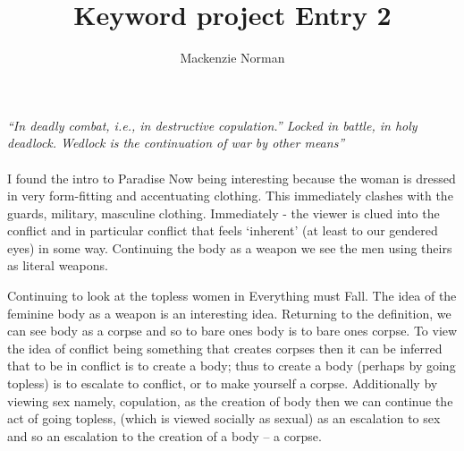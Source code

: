 \documentclass{article}
\title{Keyword project Entry 2}
\author{Mackenzie Norman}
\begin{document}
\textit{``In deadly combat, i.e., in destructive copulation.'' Locked in battle, in holy deadlock. Wedlock is the continuation of war by other means'' }

\paragraph{}

I found the intro to Paradise Now being interesting because the woman is dressed in very form-fitting and accentuating clothing. This immediately clashes with the guards, military, masculine clothing. Immediately - the viewer is clued into the conflict and in particular conflict that feels `inherent' (at least to our gendered eyes) in some way. Continuing the body as a weapon we see the men using theirs as literal weapons.  

Continuing to look at the topless women in Everything must Fall. The idea of the feminine body as a weapon is an interesting idea. Returning to the definition, we can see body as a corpse and so to bare ones body is to bare ones corpse. To view the idea of conflict being something that creates corpses then it can be inferred that to be in conflict is to create a body; thus to create a body (perhaps by going topless) is to escalate to conflict, or to make yourself a corpse. Additionally by viewing sex namely, copulation, as the creation of body then we can continue the act of going topless, (which is viewed socially as sexual) as an escalation to sex and so an escalation to the creation of a body  -- a corpse. 
\end{document}
